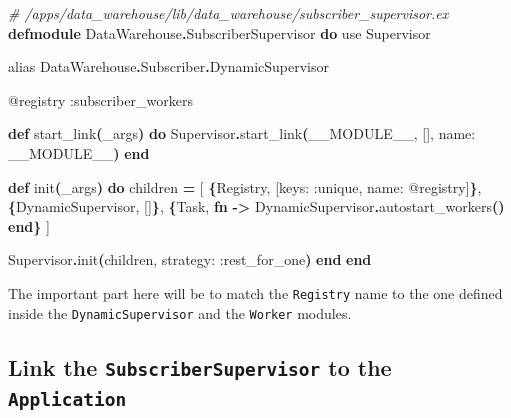 \documentclass[
  oneside]{book}
\newenvironment{Shaded}{\begin{snugshade}}{\end{snugshade}}
\newcommand{\CommentTok}[1]{\textcolor[rgb]{0.56,0.35,0.01}{\textit{#1}}}
\newcommand{\ConstantTok}[1]{\textcolor[rgb]{0.56,0.35,0.01}{#1}}
\newcommand{\FunctionTok}[1]{\textcolor[rgb]{0.13,0.29,0.53}{\textbf{#1}}}
\newcommand{\ImportTok}[1]{#1}
\newcommand{\KeywordTok}[1]{\textcolor[rgb]{0.13,0.29,0.53}{\textbf{#1}}}
\newcommand{\NormalTok}[1]{#1}
\newcommand{\OperatorTok}[1]{\textcolor[rgb]{0.81,0.36,0.00}{\textbf{#1}}}
\newcommand{\OtherTok}[1]{\textcolor[rgb]{0.56,0.35,0.01}{#1}}
\newcommand{\VariableTok}[1]{\textcolor[rgb]{0.00,0.00,0.00}{#1}}
\begin{document}
\begin{Shaded}
\begin{Highlighting}[]
\CommentTok{\# /apps/data\_warehouse/lib/data\_warehouse/subscriber\_supervisor.ex}
\KeywordTok{defmodule} \ConstantTok{DataWarehouse}\OperatorTok{.}\ConstantTok{SubscriberSupervisor} \KeywordTok{do}
  \ImportTok{use} \ConstantTok{Supervisor}

  \ImportTok{alias} \ConstantTok{DataWarehouse}\OperatorTok{.}\ConstantTok{Subscriber}\OperatorTok{.}\ConstantTok{DynamicSupervisor}

  \OtherTok{@registry} \VariableTok{:subscriber\_workers}

  \KeywordTok{def}\NormalTok{ start\_link}\FunctionTok{(}\NormalTok{\_args}\FunctionTok{)} \KeywordTok{do}
    \ConstantTok{Supervisor}\OperatorTok{.}\NormalTok{start\_link}\FunctionTok{(}\ConstantTok{\_\_MODULE\_\_}\NormalTok{, }\OtherTok{[]}\NormalTok{, }\VariableTok{name:} \ConstantTok{\_\_MODULE\_\_}\FunctionTok{)}
  \KeywordTok{end}

  \KeywordTok{def}\NormalTok{ init}\FunctionTok{(}\NormalTok{\_args}\FunctionTok{)} \KeywordTok{do}
\NormalTok{    children }\OperatorTok{=} \OtherTok{[}
      \FunctionTok{\{}\ConstantTok{Registry}\NormalTok{, }\OtherTok{[}\VariableTok{keys:} \VariableTok{:unique}\NormalTok{, }\VariableTok{name:} \OtherTok{@registry]}\FunctionTok{\}}\NormalTok{,}
      \FunctionTok{\{}\ConstantTok{DynamicSupervisor}\NormalTok{, }\OtherTok{[]}\FunctionTok{\}}\NormalTok{,}
      \FunctionTok{\{}\ConstantTok{Task}\NormalTok{,}
       \KeywordTok{fn} \OperatorTok{{-}\textgreater{}}
         \ConstantTok{DynamicSupervisor}\OperatorTok{.}\NormalTok{autostart\_workers}\FunctionTok{()}
       \KeywordTok{end}\FunctionTok{\}}
    \OtherTok{]}

    \ConstantTok{Supervisor}\OperatorTok{.}\NormalTok{init}\FunctionTok{(}\NormalTok{children, }\VariableTok{strategy:} \VariableTok{:rest\_for\_one}\FunctionTok{)}
  \KeywordTok{end}
\KeywordTok{end}
\end{Highlighting}
\end{Shaded}

The important part here will be to match the \texttt{Registry} name to the one defined inside the \texttt{DynamicSupervisor} and the \texttt{Worker} modules.

\subsection{\texorpdfstring{Link the \texttt{SubscriberSupervisor} to the \texttt{Application}}{Link the SubscriberSupervisor to the Application}}\label{link-the-subscribersupervisor-to-the-application}
\end{document}

